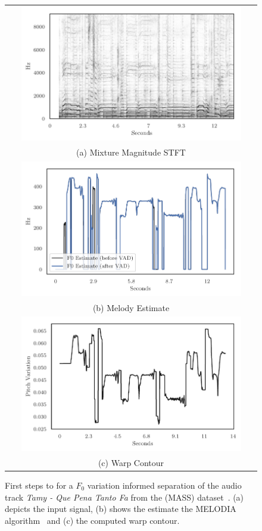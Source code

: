 \begin{figure}
  \centering
\begin{tabular}{c}
  \includegraphics[width=0.9\textwidth]{Chapters/05_Separation_Known/warp-demo/Mixture.pdf} \\
(a) Mixture Magnitude STFT \\[6pt]
\includegraphics[width=0.9\textwidth]{Chapters/05_Separation_Known/warp-demo/Melodia.pdf} \\
(b) Melody Estimate \\[6pt]
\includegraphics[width=0.9\textwidth]{Chapters/05_Separation_Known/warp-demo/Contour.pdf} \\
(c) Warp Contour \\[6pt]
\end{tabular}
\caption{First steps to for a $F_0$ variation informed separation of the audio track \emph{Tamy - Que Pena Tanto Fa} from the (MASS) dataset~\cite{MTGMASSdb}. (a) depicts the input signal, (b) shows the estimate the MELODIA algorithm~\cite{salamon12} and (c) the computed warp contour.} %
\label{fig:warp_sisec_demoa}
\end{figure}


